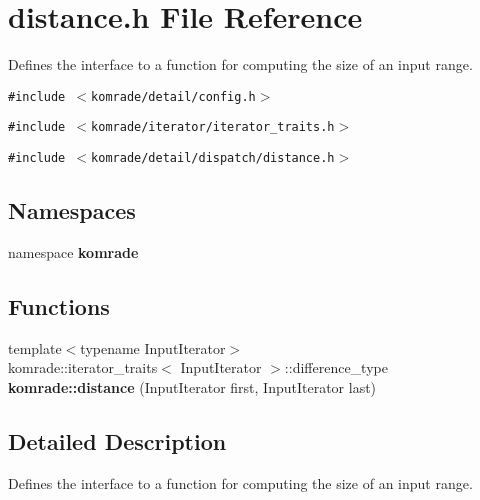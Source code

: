 \section{distance.h File Reference}
\label{distance_8h}
Defines the interface to a function for computing the size of an input range. 

{\tt \#include $<$komrade/detail/config.h$>$}\par
{\tt \#include $<$komrade/iterator/iterator\_\-traits.h$>$}\par
{\tt \#include $<$komrade/detail/dispatch/distance.h$>$}\par
\subsection*{Namespaces}
\begin{CompactItemize}
\item 
namespace {\bf komrade}
\end{CompactItemize}
\subsection*{Functions}
\begin{CompactItemize}
\item 
{\footnotesize template$<$typename InputIterator$>$ }\\komrade::iterator\_\-traits$<$ InputIterator $>$::difference\_\-type {\bf komrade::distance} (InputIterator first, InputIterator last)
\end{CompactItemize}


\subsection{Detailed Description}
Defines the interface to a function for computing the size of an input range. 

